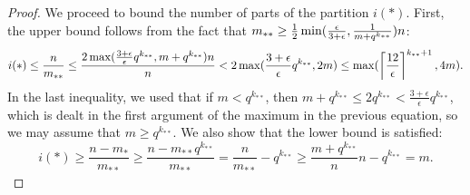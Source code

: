 \begin{theorem}
\begin{proof}
                We proceed to bound the number of parts of the partition $i(*)$.
                First, the upper bound follows from the fact that
                $m_{**} \geq \frac{1}{2} \min ( \frac{\epsilon} {3 + \epsilon}, \frac{1}{m + q^{k_{**}}} ) n$:
                \[
                    i(*) \leq \frac{n}{m_{**}} \leq \frac{2 \max ( \frac{3 + \epsilon}{\epsilon} q^{k_{**}}, m + q^{k_{**}} )n}{n}
                         < 2 \max ( \frac{3 + \epsilon}{\epsilon} q^{k_{**}}, 2m )
                         \leq \max ( \left\lceil \frac{12}{\epsilon} \right\rceil^{k_{**}+1}, 4m ).
                \]
                In the last inequality, we used that if $m < q^{k_{**}}$, then $m + q^{k_{**}} \leq 2q^{k_{**}} < \frac{3 + \epsilon}{\epsilon} q^{k_{**}}$,
                which is dealt in the first argument of the maximum in the previous equation, so we may assume that $m \geq q^{k_{**}}$.
                We also show that the lower bound is satisfied:
                \[
                    i(*) \geq \frac{n - m_*}{m_{**}}
                         \geq \frac{n - m_{**}q^{k_{**}}}{m_{**}}
                         = \frac{n}{m_{**}} - q^{k_{**}}
                         \geq \frac{m + q^{k_{**}}}{n} n - q^{k_{**}}
                         = m.
                \]
            \end{proof}
        \end{theorem}

